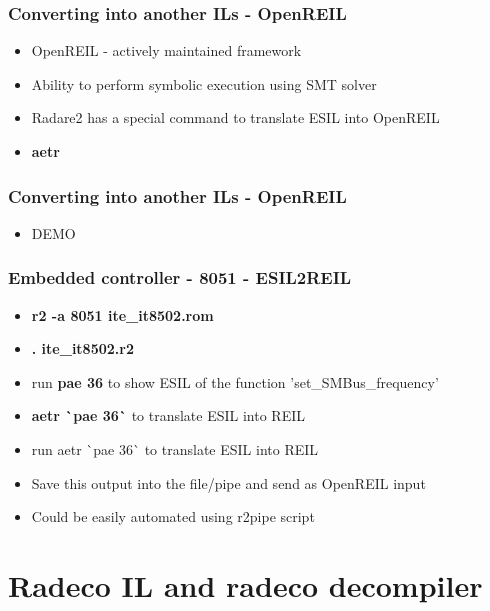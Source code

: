 \documentclass[10pt,pdf,utf8,english,compress,hyperref={unicode}]{beamer}
\begin{document}
\begin{frame}[fragile]
  \frametitle{Converting into another ILs - OpenREIL}
     \begin{itemize}
        \item OpenREIL - actively maintained framework
		\item Ability to perform symbolic execution using SMT solver
		\item Radare2 has a special command to translate ESIL into OpenREIL
		\item \alert{\bf{aetr}}
      \end{itemize}
\end{frame}

\begin{frame}[fragile]
  \frametitle{Converting into another ILs - OpenREIL}
     \begin{itemize}
        \item DEMO
      \end{itemize}
\end{frame}

\begin{frame}[fragile]
  \frametitle{Embedded controller - 8051 - ESIL2REIL}
  \begin{itemize}
	  \item \alert{\bf{r2 -a 8051 ite\_it8502.rom}}
	  \item \alert{\bf{. ite\_it8502.r2}}
	  \item run \alert{\bf{pae 36}} to show ESIL of the function 'set\_SMBus\_frequency'
\ifxetex
	  \item \alert{\bf{aetr \`{}pae 36\`}} to translate ESIL into REIL
\else
	  \item run aetr \`{}pae 36\`{} to translate ESIL into REIL
\fi
	  \item Save this output into the file/pipe and send as OpenREIL input
	  \item Could be easily automated using r2pipe script
  \end{itemize}
\end{frame}

\section{Radeco IL and radeco decompiler}
\end{document}
